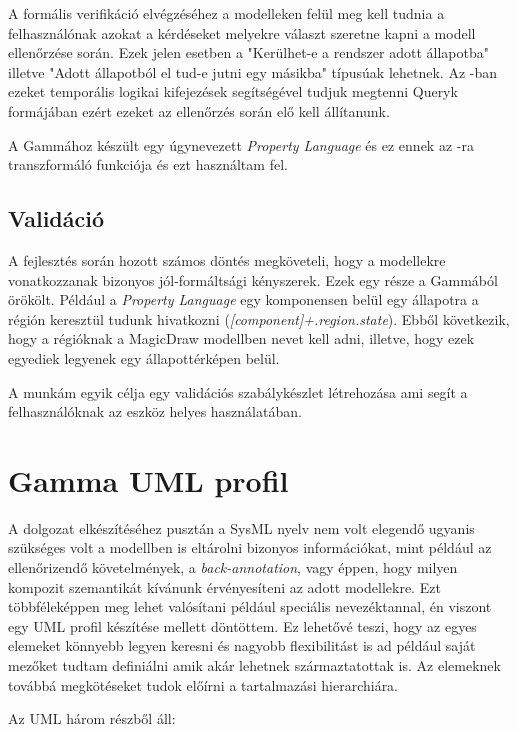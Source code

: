 A formális verifikáció elvégzéséhez a modelleken felül meg kell tudnia a felhasználónak azokat a kérdéseket melyekre választ szeretne kapni a modell ellenőrzése során. Ezek jelen esetben a "Kerülhet-e a rendszer adott állapotba" illetve "Adott állapotból el tud-e jutni egy másikba" típusúak lehetnek. Az \uppaal-ban ezeket temporális logikai kifejezések segítségével tudjuk megtenni \uppaal Queryk formájában ezért ezeket az ellenőrzés során elő kell állítanunk.

A Gammához készült egy úgynevezett \emph{Property Language} és ez ennek az \uppaal-ra transzformáló funkciója és ezt használtam fel.

\subsection{Validáció}

A fejlesztés során hozott számos döntés megköveteli, hogy a modellekre vonatkozzanak bizonyos jól-formáltsági kényszerek. Ezek egy része a Gammából örökölt. Például a \emph{Property Language} egy komponensen belül egy állapotra a régión keresztül tudunk hivatkozni (\emph{[component]+.region.state}). Ebből következik, hogy a régióknak a MagicDraw modellben nevet kell adni, illetve, hogy ezek egyediek legyenek egy állapottérképen belül.

A munkám egyik célja egy validációs szabálykészlet létrehozása ami segít a felhasználóknak az eszköz helyes használatában.

\newpage

\section{Gamma UML profil}

A dolgozat elkészítéséhez pusztán a SysML nyelv nem volt elegendő ugyanis szükséges volt  a modellben is eltárolni  bizonyos információkat, mint például az ellenőrizendő követelmények, a  \emph{back-annotation}, vagy éppen, hogy milyen kompozit szemantikát kívánunk érvényesíteni az adott modellekre. Ezt többféleképpen meg lehet valósítani például speciális nevezéktannal, én viszont egy UML profil készítése mellett döntöttem. Ez lehetővé teszi, hogy az egyes elemeket könnyebb legyen keresni és nagyobb flexibilitást is ad például saját mezőket tudtam definiálni amik akár lehetnek származtatottak is. Az elemeknek továbbá megkötéseket tudok előírni a tartalmazási hierarchiára.

Az UML három részből áll:

